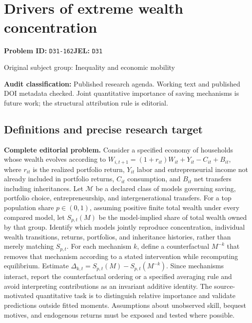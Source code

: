 \documentclass[11pt,a4paper]{article}
\begin{document}
\section*{Drivers of extreme wealth concentration}
\textbf{Problem ID:} \texttt{D31-162}\quad \textbf{JEL:} \texttt{D31}\par
\label{problem:OP-0362}
\label{audited:ECON-028}
{\sffamily\small\color{muted}Original subject group: Inequality and economic mobility\par}
\label{definitions:problem:30007644}
\textbf{Audit classification:} Published research agenda. Working text and published DOI metadata checked. Joint quantitative importance of saving mechanisms is future work; the structural attribution rule is editorial.
\subsection*{Definitions and precise research target}
\textbf{Complete editorial problem.} Consider a specified economy of households whose wealth evolves according to \(W_{i,t+1}=(1+r_{it})W_{it}+Y_{it}-C_{it}+B_{it}\), where \(r_{it}\) is the realized portfolio return, \(Y_{it}\) labor and entrepreneurial income not already included in portfolio returns, \(C_{it}\) consumption, and \(B_{it}\) net transfers including inheritances. Let \(\mathcal M\) be a declared class of models governing saving, portfolio choice, entrepreneurship, and intergenerational transfers. For a top population share \(p\in(0,1)\), assuming positive finite total wealth under every compared model, let \(S_{p,t}(M)\) be the model-implied share of total wealth owned by that group. Identify which models jointly reproduce concentration, individual wealth transitions, returns, portfolios, and inheritance histories, rather than merely matching \(S_{p,t}\). For each mechanism \(k\), define a counterfactual \(M^{-k}\) that removes that mechanism according to a stated intervention while recomputing equilibrium. Estimate \(\Delta_{k,t}=S_{p,t}(M)-S_{p,t}(M^{-k})\). Since mechanisms interact, report the counterfactual ordering or a specified averaging rule and avoid interpreting contributions as an invariant additive identity. The source-motivated quantitative task is to distinguish relative importance and validate predictions outside fitted moments. Assumptions about unobserved skill, bequest motives, and endogenous returns must be exposed and tested where possible.
\end{document}
